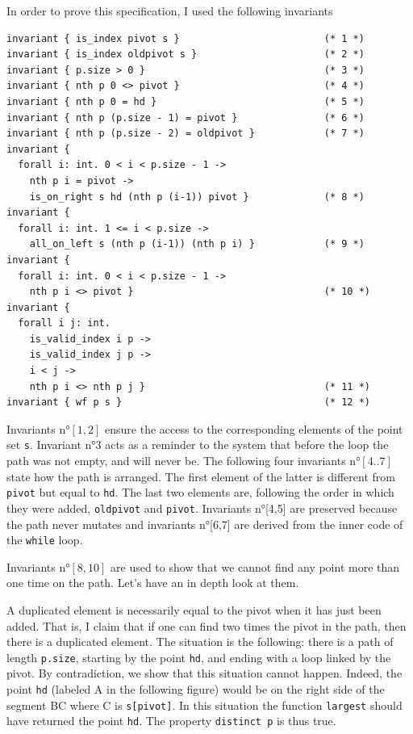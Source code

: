 \documentclass[a4paper, 11pt]{article}
\begin{document}
In order to prove this specification, I used the following invariants
\begin{lstlisting}[language=whyml, escapechar=€, style=mystyle]
invariant { is_index pivot s }                         (* 1 *)
invariant { is_index oldpivot s }                      (* 2 *)
invariant { p.size > 0 }                               (* 3 *)
invariant { nth p 0 <> pivot }                         (* 4 *)
invariant { nth p 0 = hd }                             (* 5 *)
invariant { nth p (p.size - 1) = pivot }               (* 6 *)
invariant { nth p (p.size - 2) = oldpivot }            (* 7 *)
invariant {
  forall i: int. 0 < i < p.size - 1 ->
    nth p i = pivot ->
    is_on_right s hd (nth p (i-1)) pivot }             (* 8 *)
invariant {
  forall i: int. 1 <= i < p.size ->
    all_on_left s (nth p (i-1)) (nth p i) }            (* 9 *)
invariant {
  forall i: int. 0 < i < p.size - 1 ->
    nth p i <> pivot }                                 (* 10 *)
invariant {
  forall i j: int.
    is_valid_index i p ->
    is_valid_index j p ->
    i < j ->
    nth p i <> nth p j }                               (* 11 *)
invariant { wf p s }                                   (* 12 *)
\end{lstlisting}

Invariants n°$[1,2]$ ensure the access to the corresponding elements of the
point set \texttt{s}. Invariant n°3 acts as a reminder to the system that
before the loop the path {\ttp} was not empty, and will never be. The following
four invariants n°$[4..7]$ state how the path is arranged.
The first element of the latter is different from \texttt{pivot} but equal to \texttt{hd}.
The last two elements are, following the order in which they were added, \texttt{oldpivot}
and \texttt{pivot}.
Invariants n°[4,5] are preserved because
the path never mutates and invariants n°[6,7] are derived from the inner code
of the \texttt{while} loop.


Invariants n°$[8, 10]$ are used to show that we cannot find any point more
than one time on the path. Let's have an in depth look at them.

A duplicated element is necessarily equal to the pivot when it has just been
added. That is, I claim that if one can find two times the pivot in the path,
then there is a duplicated element. The situation is the following: there is a
path of length \texttt{p.size}, starting by the point \texttt{hd}, and ending
with a loop linked by the pivot. By contradiction, we show that this situation
cannot happen. Indeed, the point \texttt{hd} (labeled \textsf{A} in the
following figure) would be on the right side of the segment \textsf{BC} where
\textsf{C} is \texttt{s[pivot]}. In this situation the function
\texttt{largest} should have returned the point \texttt{hd}. The property
\texttt{distinct p} is thus true.
\end{document}
